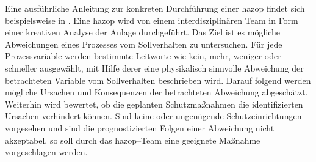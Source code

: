 Eine ausf\"uhrliche Anleitung zur konkreten Durchf\"uhrung einer \ac{hazop} findet sich beispielsweise in  \cite{Crawley_2015}. \newline
Eine \ac{hazop} wird von einem interdisziplin\"aren Team in Form einer kreativen Analyse der Anlage durchgef\"uhrt. Das Ziel ist es m\"ogliche Abweichungen eines Prozesses vom Sollverhalten zu untersuchen. F\"ur jede Prozessvariable werden bestimmte Leitworte wie \glqq kein\grqq { }, \glqq mehr\grqq { }, \glqq weniger\grqq { } oder \glqq schneller\grqq { } ausgew\"ahlt, mit Hilfe derer eine physikalisch sinnvolle Abweichung der betrachteten Variable vom Sollverhalten beschrieben wird. Darauf folgend werden m\"ogliche Ursachen und Konsequenzen der betrachteten Abweichung abgesch\"atzt. Weiterhin wird bewertet, ob die geplanten Schutzma\ss{}nahmen die identifizierten Ursachen verhindert k\"onnen. Sind keine oder ungen\"ugende Schutzeinrichtungen vorgesehen und sind die prognostizierten Folgen einer Abweichung nicht akzeptabel, so soll durch das \ac{hazop}--Team eine geeignete Ma\ss{}nahme vorgeschlagen werden. 

 


